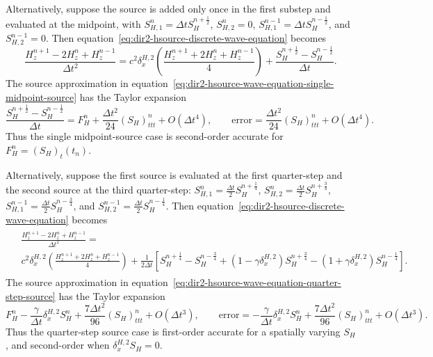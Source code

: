 \documentclass{article}
\numberwithin{figure}{section}
\begin{document}
Alternatively, suppose the source is added only once in the first substep and evaluated at the midpoint, with $S_{H,1}^n=\Delta t S_H^{n+\frac{1}{2}}$, $S_{H,2}^n=0$, $S_{H,1}^{n-1}=\Delta t S_H^{n-\frac{1}{2}}$, and $S_{H,2}^{n-1}=0$. Then equation~\eqref{eq:dir2-hsource-discrete-wave-equation} becomes
\begin{equation}
    \frac{H_z^{n+1}-2H_z^n+H_z^{n-1}}{\Delta t^2}=c^2\delta_x^{H,2}\left(\frac{H_z^{n+1}+2H_z^n+H_z^{n-1}}{4}\right)+\frac{S_H^{n+\frac{1}{2}}-S_H^{n-\frac{1}{2}}}{\Delta t}. \label{eq:dir2-hsource-wave-equation-single-midpoint-source}
\end{equation}
The source approximation in equation~\eqref{eq:dir2-hsource-wave-equation-single-midpoint-source} has the Taylor expansion
\begin{equation}
    \frac{S_H^{n+\frac{1}{2}}-S_H^{n-\frac{1}{2}}}{\Delta t}=F_H^n+\frac{\Delta t^2}{24}(S_H)_{ttt}^n+O(\Delta t^4), \qquad \mathrm{error}=\frac{\Delta t^2}{24}(S_H)_{ttt}^n+O(\Delta t^4). \label{eq:dir2-hsource-single-midpoint-source-error}
\end{equation}
Thus the single midpoint-source case is second-order accurate for $F_H^n=(S_H)_t(t_n)$.

Alternatively, suppose the first source is evaluated at the first quarter-step and the second source at the third quarter-step:
$S_{H,1}^n=\frac{\Delta t}{2}S_H^{n+\frac{1}{4}}$, $S_{H,2}^n=\frac{\Delta t}{2}S_H^{n+\frac{3}{4}}$, $S_{H,1}^{n-1}=\frac{\Delta t}{2}S_H^{n-\frac{3}{4}}$, and $S_{H,2}^{n-1}=\frac{\Delta t}{2}S_H^{n-\frac{1}{4}}$. Then equation~\eqref{eq:dir2-hsource-discrete-wave-equation} becomes
\begin{align}
    \begin{split}
         & \frac{H_z^{n+1}-2H_z^n+H_z^{n-1}}{\Delta t^2}=                                                                                                                                                                                                               \\
         & c^2\delta_x^{H,2}\left(\frac{H_z^{n+1}+2H_z^n+H_z^{n-1}}{4}\right)+\frac{1}{2\Delta t}\left[S_H^{n+\frac{1}{4}}-S_H^{n-\frac{3}{4}}+\left(1-\gamma\delta_x^{H,2}\right)S_H^{n+\frac{3}{4}}-\left(1+\gamma\delta_x^{H,2}\right)S_H^{n-\frac{1}{4}}\right]. \label{eq:dir2-hsource-wave-equation-quarter-step-source}
    \end{split}
\end{align}
The source approximation in equation~\eqref{eq:dir2-hsource-wave-equation-quarter-step-source} has the Taylor expansion
\begin{equation}
    F_H^n-\frac{\gamma}{\Delta t}\delta_x^{H,2}S_H^n+\frac{7\Delta t^2}{96}(S_H)_{ttt}^n+O(\Delta t^3), \qquad \mathrm{error}=-\frac{\gamma}{\Delta t}\delta_x^{H,2}S_H^n+\frac{7\Delta t^2}{96}(S_H)_{ttt}^n+O(\Delta t^3). \label{eq:dir2-hsource-quarter-step-source-error}
\end{equation}
Thus the quarter-step source case is first-order accurate for a spatially varying $S_H$, and second-order when $\delta_x^{H,2}S_H=0$.
\end{document}
